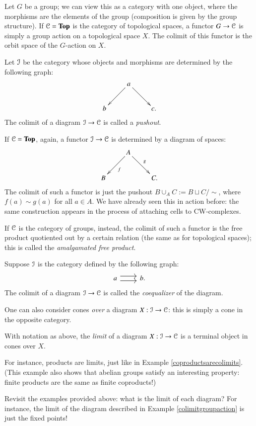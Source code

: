 \begin{example}\label{colimitgroupaction}
    Let $G$ be a group; we can view this as a category with one object, where the morphisms are the elements of the group
    (composition is given by the group structure).
    If $\mathcal C = \mathbf{Top}$ is the category of topological spaces, a functor $G\to \mathcal C$ is simply a
    group action on a topological space $X$.
    The colimit of this functor is the orbit space of the $G$-action on $X$.
\end{example}
\begin{example}
    Let $\mathcal I$ be the category whose objects and morphisms are determined by the following graph:
    \begin{equation*}
	\xymatrix{ & a\ar[dl]\ar[dr] & \\
	b & & c.}
    \end{equation*}
    The colimit of a diagram $\mathcal I\to \mathcal C$ is called a \emph{pushout}.

    If $\mathcal C=\mathbf{Top}$, again, a functor $\mathcal I\to \mathcal C$ is determined by a diagram of spaces:
    \begin{equation*}
	\xymatrix{
	    & A\ar[dl]^f\ar[dr]^g & \\
	    B & & C.
	    }
    \end{equation*}
    The colimit of such a functor is just the pushout $B\cup_A C:= B\sqcup C/\sim$, where $f(a)\sim g(a)$ for all $a\in A$.
    We have already seen this in action before: the same construction appears in the process of attaching cells to CW-complexes.

    If $\mathcal C$ is the category of groups, instead, the colimit of such a functor is the free product quotiented out
    by a certain relation (the same as for topological spaces); this is called the \emph{amalgamated free product}.
\end{example}
\begin{example}
    Suppose $\mathcal I$ is the category defined by the following graph:
\begin{equation*}
    \begin{tikzcd}
	a\ar[r,shift left=.75ex]\ar[r,shift right=.75ex] & b.
    \end{tikzcd}
\end{equation*}
    The colimit of a diagram $\mathcal I\to\mathcal C$ is called the \emph{coequalizer} of the diagram.
\end{example}

    One can also consider cones \emph{over} a diagram $X:\mathcal I\to\mathcal C$: this is simply a cone in the opposite category.
\begin{definition}
    With notation as above, the \emph{limit} of a diagram $X:\mathcal I\to\mathcal C$ is a terminal object in cones over $X$.
\end{definition}
For instance, products are limits, just like in Example \ref{coproductsarecolimits}.
(This example also shows that abelian groups satisfy an interesting property: finite products are the same as finite coproducts!)
\begin{exercise}
    Revisit the examples provided above: what is the limit of each diagram?
    For instance, the limit of the diagram described in Example \ref{colimitgroupaction} is just the fixed points!
\end{exercise}
